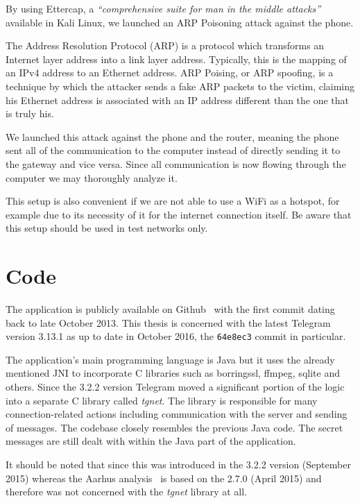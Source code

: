 \documentclass[thesis=M,english]{FITthesis}[2012/10/20]
\begin{document}
By using Ettercap, a \emph{``comprehensive suite for man in the middle attacks''}~\cite{ettercap-homepage} available in Kali Linux, we launched an ARP Poisoning attack against the phone.

The Address Resolution Protocol (ARP) is a protocol which transforms an Internet layer address into a link layer address. Typically, this is the mapping of an IPv4 address to an Ethernet address. ARP Poising, or ARP spoofing, is a technique by which the attacker sends a fake ARP packets to the victim, claiming his Ethernet address is associated with an IP address different than the one that is truly his.

We launched this attack against the phone and the router, meaning the phone sent all of the communication to the computer instead of directly sending it to the gateway and vice versa. Since all communication is now flowing through the computer we may thoroughly analyze it.

This setup is also convenient if we are not able to use a WiFi as a hotspot, for example due to its necessity of it for the internet connection itself. Be aware that this setup should be used in test networks only.

\section{Code}

The application is publicly available on Github~\cite{github-telegram} with the first commit dating back to late October 2013. This thesis is concerned with the latest Telegram version 3.13.1 as up to date in October 2016, the \texttt{64e8ec3} commit in particular.

The application's main programming language is Java but it uses the already mentioned JNI to incorporate C libraries such as borringssl, ffmpeg, sqlite and others. Since the 3.2.2 version Telegram moved a significant portion of the logic into a separate C library called \emph{tgnet}. The library is responsible for many connection-related actions including communication with the server and sending of messages. The codebase closely resembles the previous Java code. The secret messages are still dealt with within the Java part of the application.

It should be noted that since this was introduced in the 3.2.2 version (September 2015) whereas the Aarhus analysis~\cite{telegram-aarhus} is based on the 2.7.0 (April 2015) and therefore was not concerned with the \emph{tgnet} library at all.
\end{document}
